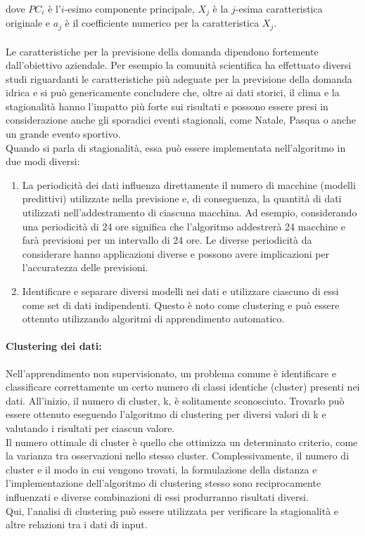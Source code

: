 \documentclass[12pt,a4paper]{report}
\begin{document}
dove $PC_i$ è l'$i$-esimo componente principale, $X_j$ è la $j$-esima caratteristica originale e $a_j$ è il coefficiente numerico per la caratteristica $X_j$.\\
\\
Le caratteristiche per la previsione della domanda dipendono fortemente dall'obiettivo aziendale. Per esempio la comunità scientifica ha effettuato diversi studi riguardanti le caratteristiche più adeguate per la previsione della domanda idrica \cite{antunes2018short} e si può genericamente concludere che, oltre ai dati storici, il clima e la stagionalità hanno l'impatto più forte sui risultati e possono essere presi in considerazione anche gli sporadici eventi stagionali, come Natale, Pasqua o anche un grande evento sportivo.\\
Quando si parla di stagionalità, essa può essere implementata nell'algoritmo in due modi diversi:
\begin{enumerate}
    \item La periodicità dei dati influenza direttamente il numero di macchine (modelli predittivi) utilizzate nella previsione e, di conseguenza, la quantità di dati utilizzati nell'addestramento di ciascuna macchina. Ad esempio, considerando una periodicità di 24 ore significa che l'algoritmo addestrerà 24 macchine e farà previsioni per un intervallo di 24 ore. Le diverse periodicità da considerare hanno applicazioni diverse e possono avere implicazioni per l'accuratezza delle previsioni.
    \item Identificare e separare diversi modelli nei dati e utilizzare ciascuno di essi come set di dati indipendenti. Questo è noto come clustering e può essere ottenuto utilizzando algoritmi di apprendimento automatico.
\end{enumerate}

\paragraph*{Clustering dei dati:}
Nell'apprendimento non supervisionato, un problema comune è identificare e classificare correttamente un certo numero di classi identiche (cluster) presenti nei dati. All'inizio, il numero di cluster, k, è solitamente sconosciuto. Trovarlo può essere ottenuto eseguendo l'algoritmo di clustering per diversi valori di k e valutando i risultati per ciascun valore.\\
Il numero ottimale di cluster è quello che ottimizza un determinato criterio, come la varianza tra osservazioni nello stesso cluster.
Complessivamente, il numero di cluster e il modo in cui vengono trovati, la formulazione della distanza e l'implementazione dell'algoritmo di clustering stesso sono reciprocamente influenzati e diverse combinazioni di essi produrranno risultati diversi.\\
Qui, l'analisi di clustering può essere utilizzata per verificare la stagionalità e altre relazioni tra i dati di input.\\
\\
\end{document}
